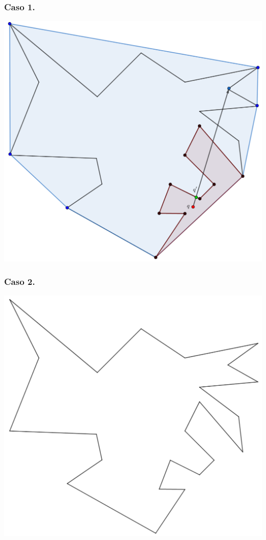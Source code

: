 \begin{frame}
  \frametitle{Caso 1.}
  \centering \includegraphics[width=0.50 \paperwidth]{images/CasosQExterno/P05.png}
\end{frame}

\begin{frame}
  \frametitle{Caso 2.}
  \centering \includegraphics[width=0.50 \paperwidth]{images/CasosQExterno/P.png}
\end{frame}

